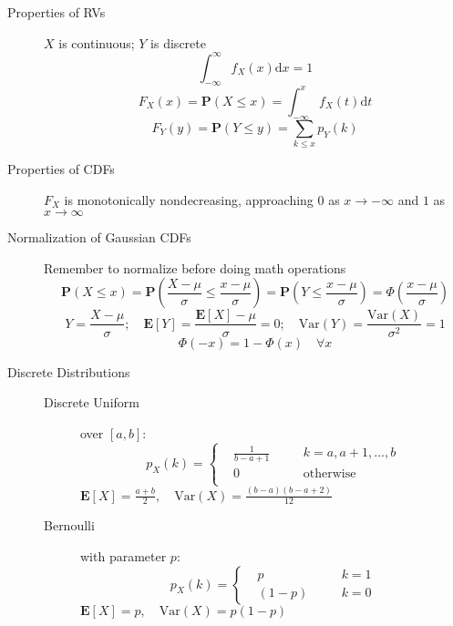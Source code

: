 \documentclass[8pt]{article}
\newcommand{\dd}[1]{\mathrm{d}{#1}}
\begin{document}

\begin{multicols}{2}
  \begin{description}
  \item[Properties of RVs] $X$ is continuous; $Y$ is discrete
    $$\int_{-\infty}^{\infty} f_X(x) \dd{x} = 1$$
    $$F_X(x)=\mathbf{P}(X\le x) = \int_{-\infty}^{x}f_X(t)\dd{t}$$
    $$F_Y(y)=\mathbf{P}(Y\le y) = \sum_{k \le x}p_Y(k)$$
  \item[Properties of CDFs] $F_X$ is monotonically nondecreasing,
    approaching $0$ as $x\rightarrow-\infty$ and $1$ as
    $x\rightarrow\infty$
  \item[Normalization of Gaussian CDFs] Remember to normalize before
    doing math operations
    {\footnotesize
      $$\mathbf{P}(X\le x) =
      \mathbf{P}\left(\frac{X-\mu}{\sigma}\le\frac{x-\mu}{\sigma}\right) =
      \mathbf{P}\left(Y\le\frac{x-\mu}{\sigma}\right) =
      \Phi\left(\frac{x-\mu}{\sigma}\right)$$
      $$Y=\frac{X-\mu}{\sigma};
      \quad\mathbf{E}[Y] = \frac{\mathbf{E}[X]-\mu}{\sigma}=0;
      \quad \text{Var}(Y) = \frac{\text{Var}(X)}{\sigma^2} = 1$$
      $$\Phi(-x) = 1 - \Phi(x)\quad \forall x$$
    }
  \item[Discrete Distributions] \hfill
    \begin{description}
    \item[Discrete Uniform] over $[a,b]$:
      \begin{equation*}
        p_X(k) = \left\{
          \begin{aligned}
            & \frac{1}{b-a+1} &&\quad k=a,a+1,\ldots,b \\
            & 0 &&\quad\text{otherwise} \\
          \end{aligned}
        \right.
      \end{equation*}
      $\mathbf{E}[X]=\frac{a+b}{2},\quad
      \text{Var}(X)=\frac{(b-a)(b-a+2)}{12}$
    \item[Bernoulli] with parameter $p$:
      \begin{equation*}
        p_X(k) = \left\{
          \begin{aligned}
            & p &&\quad k=1 \\
            & (1-p) &&\quad k=0
          \end{aligned}
        \right.
      \end{equation*}
      $\mathbf{E}[X] = p,\quad \text{Var}(X)=p(1-p)$

\end{description}
\end{description}
\end{multicols}
\end{document}
